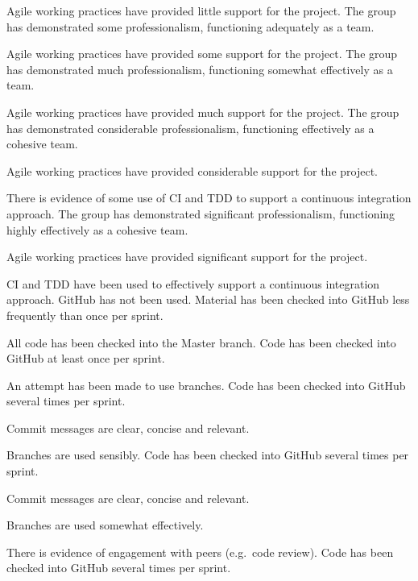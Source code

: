 \documentclass{../fal_assignment}
\begin{document}
\begin{markingrubric}
            \par Agile working practices have provided little support for the project.
        \grade The group has demonstrated some professionalism,
            functioning adequately as a team.
            \par Agile working practices have provided some support for the project.
        \grade The group has demonstrated much professionalism,
            functioning somewhat effectively as a team.
            \par Agile working practices have provided much support for the project.
        \grade The group has demonstrated considerable professionalism,
            functioning effectively as a cohesive team.
            \par Agile working practices have provided considerable support for the project.
            \par There is evidence of some use of CI and TDD to support a continuous integration approach.
        \grade The group has demonstrated significant professionalism,
            functioning highly effectively as a cohesive team.
            \par Agile working practices have provided significant support for the project.
            \par CI and TDD have been used to effectively support a continuous integration approach.
%
        \grade\fail GitHub has not been used.
        \grade Material has been checked into GitHub less frequently than once per sprint.
            \par All code has been checked into the Master branch.
        \grade Code has been checked into GitHub at least once per sprint.
            \par An attempt has been made to use branches.
        \grade Code has been checked into GitHub several times per sprint.
            \par Commit messages are clear, concise and relevant.
            \par Branches are used sensibly.
        \grade Code has been checked into GitHub several times per sprint.
            \par Commit messages are clear, concise and relevant.
            \par Branches are used somewhat effectively.
            \par There is evidence of engagement with peers (e.g.\ code review).
        \grade Code has been checked into GitHub several times per sprint.

\end{markingrubric}
\end{document}
